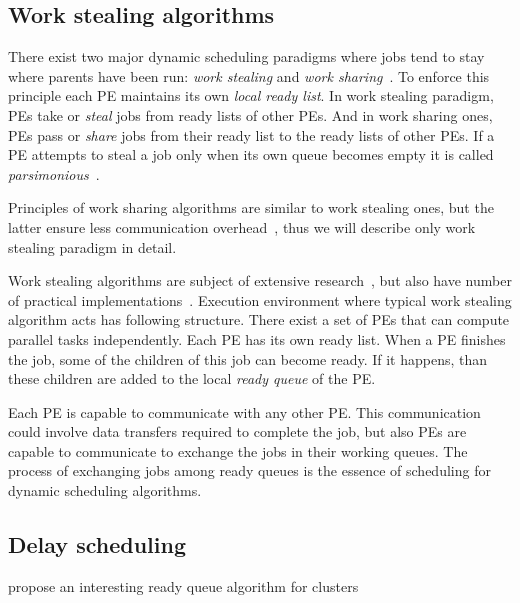 \subsection{Work stealing algorithms}
\label{sec:work_stealing}

There exist two major dynamic scheduling paradigms where jobs tend to
stay where parents have been run: \emph{work stealing} and \emph{work
  sharing}~\cite{Blumofe:1999:SMC:324133.324234}. To enforce this
principle each PE maintains its own \emph{local ready list}. In work
stealing paradigm, PEs take or \emph{steal} jobs from ready lists of
other PEs. And in work sharing ones, PEs pass or \emph{share} jobs
from their ready list to the ready lists of other PEs. If a PE
attempts to steal a job only when its own queue becomes empty it is
called \emph{parsimonious}~\cite{Spoonhower:2009:BNP:1583991.1584019}.

Principles of work sharing algorithms are similar to work stealing
ones, but the latter ensure less communication
overhead~\cite{Blumofe:1999:SMC:324133.324234}, thus we will describe
only work stealing paradigm in detail.

Work stealing algorithms are subject of extensive
research~\cite{Spoonhower:2009:BNP:1583991.1584019,
  Blumofe:1999:SMC:324133.324234, Acar:2000:DLW:341800.341801,
  Arora:1998:TSM:277651.277678}, but also have number of practical
implementations~\cite{Halstead:1984:IML:800055.802017,
  Blumofe:1995:CEM:209937.209958}.  Execution environment where
typical work stealing algorithm acts has following structure. There
exist a set of PEs that can compute parallel tasks independently. Each
PE has its own ready list. When a PE finishes the job, some of the
children of this job can become ready. If it happens, than these
children are added to the local \emph{ready queue} of the PE.

Each PE is capable to communicate with any other PE. This
communication could involve data transfers required to complete the
job, but also PEs are capable to communicate to exchange the jobs in
their working queues. The process of exchanging jobs among ready
queues is the essence of scheduling for dynamic scheduling algorithms.

\subsection{Delay scheduling}
\label{sec:delay}

\cite{zaharia2010delay} propose an interesting ready queue algorithm for clusters

